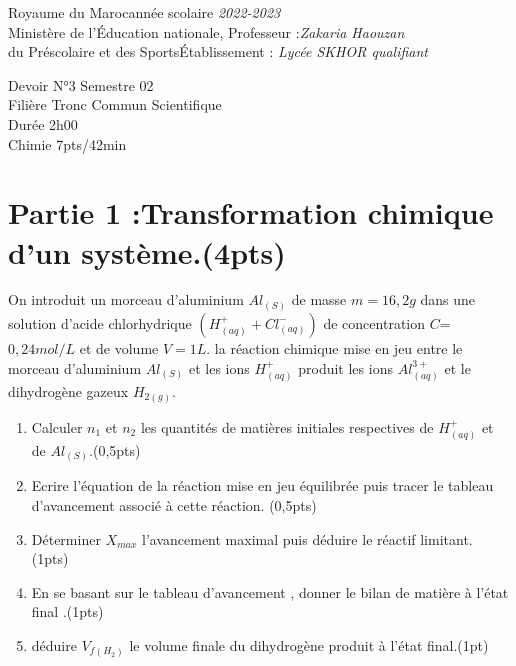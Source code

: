 \documentclass[12pt]{article}
\newcommand\headerMe[2]{\noindent{}#1\hfill#2}
\begin{document}
\headerMe{Royaume du Maroc}{année scolaire \emph{2022-2023}}\\
\headerMe{Ministère de l'Éducation nationale, }{  Professeur :\emph{Zakaria Haouzan}}\\
\headerMe{du Préscolaire et des Sports}{Établissement : \emph{Lycée SKHOR qualifiant}}\\

\begin{center}
Devoir  N°3 Semestre 02 \\
   Filière Tronc Commun Scientifique\\
Durée 2h00
\\
    \vspace{.2cm}
\hrulefill
\Large{Chimie 7pts/42min}
\hrulefill\\

\end{center}

\section*{Partie 1 :Transformation chimique d’un système.\dotfill (4pts) }
On introduit un morceau d’aluminium $Al_{(S)}$ de masse $m=16,2g$ dans une solution d’acide chlorhydrique $(H^+_{(aq)}+Cl^-_{(aq)})$ de concentration   $C$=$0,24 mol/L$ et de volume $V=1L$. la réaction chimique mise en jeu entre le morceau d’aluminium $Al_{(S)}$ et les ions $H^+_{(aq)}$ produit les ions $Al^{3+}_{(aq)}$ et le dihydrogène gazeux $H_{2(g)}$.

\begin{enumerate}
	\item  Calculer $n_1$ et $n_2$ les quantités de matières initiales respectives de $H^+_{(aq)}$ et de $Al_{(S)}$.\dotfill (0,5pts)

	\item  Ecrire l’équation de la réaction mise en jeu équilibrée puis tracer le tableau d’avancement associé à cette
réaction. \dotfill (0,5pts)
\item  Déterminer $X_{max}$ l’avancement maximal puis déduire le réactif limitant. \dotfill(1pts)
\item  En se basant sur le tableau d’avancement , donner le bilan de matière à l’état final .\dotfill(1pts)
\item  déduire $V_{f(H_2)}$ le volume finale du dihydrogène produit à l’état final.\dotfill(1pt)
\end{enumerate}
\end{document}
